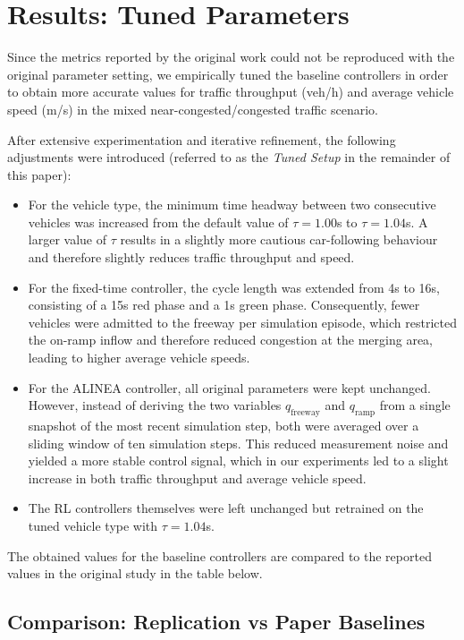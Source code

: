 \section{Results: Tuned Parameters}

Since the metrics reported by the original work could not be reproduced with the original parameter setting, we empirically tuned the baseline controllers in order to obtain more accurate values for traffic throughput (veh/h) and average vehicle speed (m/s) in the mixed near-congested/congested traffic scenario.

After extensive experimentation and iterative refinement, the following adjustments were introduced (referred to as the \textit{Tuned Setup} in the remainder of this paper):

\begin{itemize}
\item For the vehicle type, the minimum time headway between two consecutive vehicles was increased from the default value of $\tau = 1.00$s to $\tau = 1.04$s. A larger value of $\tau$ results in a slightly more cautious car-following behaviour and therefore slightly reduces traffic throughput and speed.
\item For the fixed-time controller, the cycle length was extended from 4s to 16s, consisting of a 15s red phase and a 1s green phase. Consequently, fewer vehicles were admitted to the freeway per simulation episode, which restricted the on-ramp inflow and therefore reduced congestion at the merging area, leading to higher average vehicle speeds.
\item For the ALINEA controller, all original parameters were kept unchanged. However, instead of deriving the two variables $q_\text{freeway}$ and $q_\text{ramp}$ from a single snapshot of the most recent simulation step, both were averaged over a sliding window of ten simulation steps. This reduced measurement noise and yielded a more stable control signal, which in our experiments led to a slight increase in both traffic throughput and average vehicle speed.
\item The RL controllers themselves were left unchanged but retrained on the tuned vehicle type with $\tau = 1.04$s.
\end{itemize}

The obtained values for the baseline controllers are compared to the reported values in the original study in the table below.

\subsection{Comparison: Replication vs Paper Baselines}

